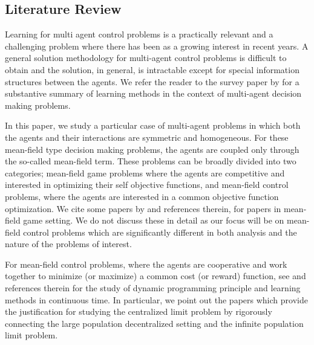 \documentclass[twoside,11pt]{article}
\begin{document}
\subsection{Literature Review}
Learning for multi agent control problems is a practically relevant and a challenging problem where there has been as a growing interest in recent years. A general solution methodology for multi-agent control problems is difficult to obtain and the solution, in general, is intractable except for special information structures between the agents. We refer the reader to the survey paper by \cite{zhang2021multi} for a substantive summary of learning methods in the context of multi-agent decision making problems. 

In this paper, we study a particular case of multi-agent problems in which both the agents and their interactions are symmetric and homogeneous. For these mean-field type decision making problems, the agents are coupled only through the so-called mean-field term. These problems can be broadly divided into two categories; mean-field game problems where the agents are competitive and interested in optimizing their self objective functions, and mean-field control problems, where the agents are interested in a common objective function optimization. We cite some papers by  \cite{gomes2014mean,carmona2013probabilistic,bensoussan2013mean,tembine2013risk,huang2007large,anahtarci2022q,elie2020convergence,fu2019actor,guo2019learning, perrin2020fictitious,subramanian2019reinforcement,saldi2018markov, saldi2019approximate} and references therein, for papers in  mean-field game setting. We do not discuss these in detail as our focus will be on mean-field control problems which are significantly different in both analysis and the nature of the problems of interest. 



 For mean-field control problems, where the agents are cooperative and work together to minimize (or maximize) a common cost (or reward) function, see \cite{bayraktar2018randomized,djete2022mckean, lauriere2014dynamic,  carmona2022convergence,pham2017dynamic,carmona2021convergence,germain2022numerical,bayraktar2021mean,bayraktar2021solvability} and references therein for the study of dynamic programming principle and learning methods in continuous time.  In particular, we point out the papers  \cite{lacker2017limit,djete2022mckean} which provide the justification for studying the centralized limit problem by rigorously connecting the large population decentralized setting and the infinite population limit problem.
\end{document}
